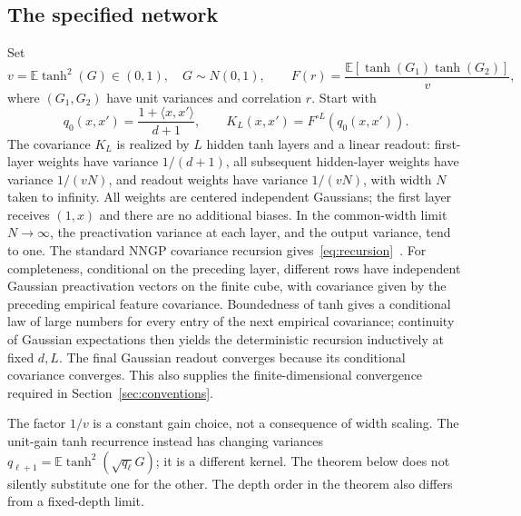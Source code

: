 \documentclass[11pt]{article}
\theoremstyle{remark}\newtheorem{remark}[theorem]{Remark}
\newcommand{\E}{\mathbb E}
\begin{document}
\subsection{The specified network}
Set
\[
 v=\E\tanh^2(G)\in(0,1),\quad G\sim N(0,1),\qquad
 F(r)=\frac{\E[\tanh(G_1)\tanh(G_2)]}{v},
\]
where $(G_1,G_2)$ have unit variances and correlation $r$. Start with
\begin{equation}\label{eq:recursion}
 q_0(x,x')=\frac{1+\langle x,x'\rangle}{d+1},\qquad
 K_L(x,x')=F^{\circ L}(q_0(x,x')).
\end{equation}
The covariance $K_L$ is realized by $L$ hidden tanh layers and a linear readout: first-layer weights have variance $1/(d+1)$, all subsequent hidden-layer weights have variance $1/(vN)$, and readout weights have variance $1/(vN)$, with width $N$ taken to infinity. All weights are centered independent Gaussians; the first layer receives $(1,x)$ and there are no additional biases. In the common-width limit $N\to\infty$, the preactivation variance at each layer, and the output variance, tend to one. The standard NNGP covariance recursion gives~\eqref{eq:recursion}~\cite{lee}. For completeness, conditional on the preceding layer, different rows have independent Gaussian preactivation vectors on the finite cube, with covariance given by the preceding empirical feature covariance. Boundedness of tanh gives a conditional law of large numbers for every entry of the next empirical covariance; continuity of Gaussian expectations then yields the deterministic recursion inductively at fixed $d,L$. The final Gaussian readout converges because its conditional covariance converges. This also supplies the finite-dimensional convergence required in Section~\ref{sec:conventions}.

The factor $1/v$ is a constant gain choice, not a consequence of width scaling. The unit-gain tanh recurrence instead has changing variances $q_{\ell+1}=\E\tanh^2(\sqrt{q_\ell}G)$; it is a different kernel. The theorem below does not silently substitute one for the other. The depth order in the theorem also differs from a fixed-depth limit.
\end{document}
